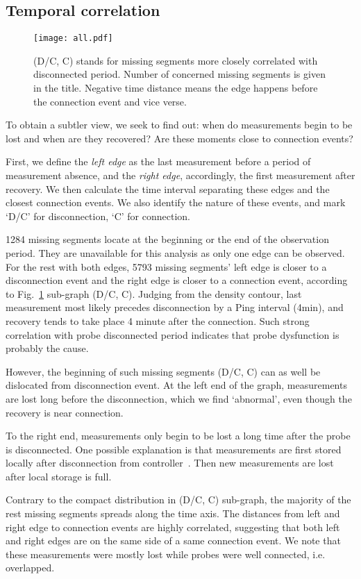 \documentclass{sig-alternate-10pt}
\begin{document}
\subsection{Temporal correlation}
\begin{figure}[!htb]
\centering
\texttt{[image: all.pdf]}
\caption{(D/C, C) stands for missing segments more closely correlated with disconnected period.
Number of concerned missing segments is given in the title. Negative time distance means the edge happens before the connection event and vice verse.}
\label{fig:all}
\end{figure}
To obtain a subtler view, we seek to find out: when do measurements begin to be lost and when are they recovered? Are these moments close to connection events?

First, we define the \textit{left edge} as the last measurement before a period of measurement absence, and the \textit{right edge}, accordingly, the first measurement after recovery. 
We then calculate the time interval separating these edges and the closest connection events. We also identify the nature of these events, and mark `D/C' for disconnection, `C' for connection. 

1284 missing segments locate at the beginning or the end of the observation period. 
They are unavailable for this analysis as only one edge can be observed.
For the rest with both edges, 5793 missing segments' left edge is closer to a disconnection event and the right edge is closer to a connection event, according to Fig.~\ref{fig:all} sub-graph (D/C, C).
Judging from the density contour, last measurement most likely precedes disconnection by a Ping interval (4min), and recovery tends to take place 4 minute after the connection.
Such strong correlation with probe disconnected period indicates that probe dysfunction is probably the cause.

However, the beginning of such missing segments (D/C, C) can as well be dislocated from disconnection event.
At the left end of the graph, measurements are lost long before the disconnection, which we find `abnormal', even though the recovery is near connection.

To the right end, measurements only begin to be lost a long time after the probe is disconnected. One possible explanation is that measurements are first stored locally after disconnection from controller~\cite{usb}. Then new measurements are lost after local storage is full.

Contrary to the compact distribution in (D/C, C) sub-graph, the majority of the rest missing segments spreads along the time axis. 
The distances from left and right edge to connection events are highly correlated, suggesting that both left and right edges are on the same side of a same connection event.
We note that these measurements were mostly lost while probes were well connected, i.e. overlapped.
\end{document}
